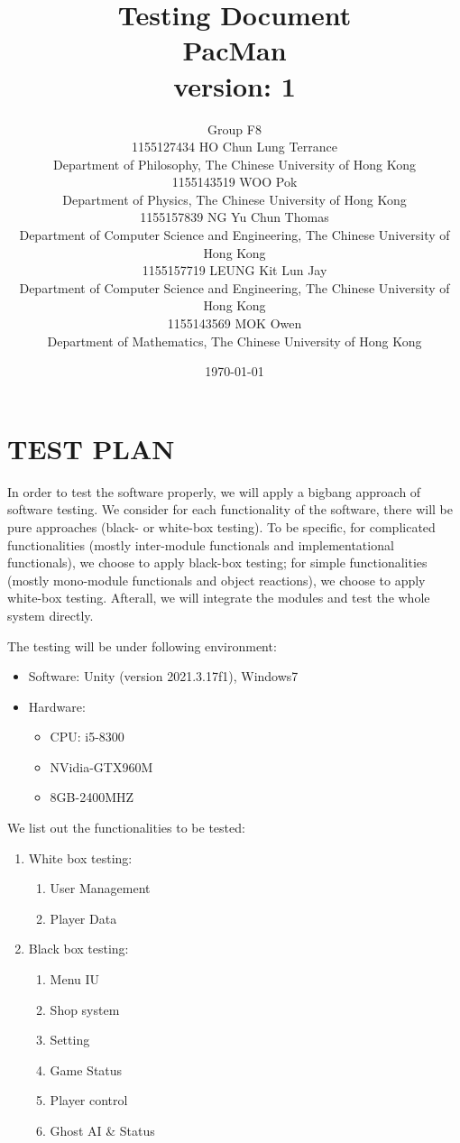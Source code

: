 \documentclass[11pt]{article}
\title{Testing Document\\PacMan\\version: 1}
\author{Group F8\\1155127434 HO Chun Lung Terrance\\
Department of Philosophy, The Chinese University of Hong Kong\\1155143519 WOO Pok\\
Department of Physics, The Chinese University of Hong Kong\\1155157839 NG Yu Chun Thomas\\
Department of Computer Science and Engineering, The Chinese University of Hong Kong\\1155157719 LEUNG Kit Lun Jay\\
Department of Computer Science and Engineering, The Chinese University of Hong Kong\\1155143569 MOK Owen\\
Department of Mathematics, The Chinese University of Hong Kong}
\date{\today}
\begin{document}
    \maketitle
    \tableofcontents
    \newpage

    \section{TEST PLAN}
    In order to test the software properly, we will apply a bigbang approach of software testing. We consider for each functionality of the software, there will be pure approaches (black- or white-box testing). To be specific, for complicated functionalities (mostly inter-module functionals and implementational functionals), we choose to apply black-box testing; for simple functionalities (mostly mono-module functionals and object reactions), we choose to apply white-box testing. Afterall, we will integrate the modules and test the whole system directly.

    The testing will be under following environment:
    \begin{itemize}
        \item Software: Unity (version 2021.3.17f1), Windows7
        \item Hardware: \begin{itemize}
            \item CPU: i5-8300
            \item NVidia-GTX960M
            \item 8GB-2400MHZ
        \end{itemize}
    \end{itemize}

    We list out the functionalities to be tested:

    \begin{enumerate}
        \item White box testing:\begin{enumerate}
            \item User Management
            \item Player Data
        \end{enumerate}
        \item Black box testing:\begin{enumerate}
            \item Menu IU
            \item Shop system
            \item Setting
            \item Game Status
            \item Player control
            \item Ghost AI \& Status
        \end{enumerate}
    \end{enumerate}
\end{document}
